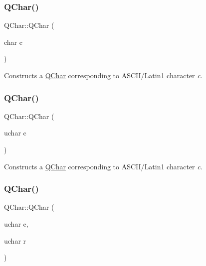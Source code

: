 \subsubsection{\texorpdfstring{QChar()}{QChar()}\hspace{0.1cm}{\footnotesize\ttfamily [2/9]}}
{\footnotesize\ttfamily Q\+Char\+::\+Q\+Char (\begin{DoxyParamCaption}\item[{char}]{c }\end{DoxyParamCaption})\hspace{0.3cm}{\ttfamily [inline]}}

Constructs a \mbox{\hyperlink{class_q_char}{Q\+Char}} corresponding to A\+S\+C\+I\+I/\+Latin1 character {\itshape c}. \mbox{\label{class_q_char_a4b67f8efac359d10c3c2b279624d1002}} 
\subsubsection{\texorpdfstring{QChar()}{QChar()}\hspace{0.1cm}{\footnotesize\ttfamily [3/9]}}
{\footnotesize\ttfamily Q\+Char\+::\+Q\+Char (\begin{DoxyParamCaption}\item[{uchar}]{c }\end{DoxyParamCaption})\hspace{0.3cm}{\ttfamily [inline]}}

Constructs a \mbox{\hyperlink{class_q_char}{Q\+Char}} corresponding to A\+S\+C\+I\+I/\+Latin1 character {\itshape c}. \mbox{\label{class_q_char_a7f5f54e09c49f6ea21627b924e9240c1}} 
\subsubsection{\texorpdfstring{QChar()}{QChar()}\hspace{0.1cm}{\footnotesize\ttfamily [4/9]}}
{\footnotesize\ttfamily Q\+Char\+::\+Q\+Char (\begin{DoxyParamCaption}\item[{uchar}]{c,  }\item[{uchar}]{r }\end{DoxyParamCaption})\hspace{0.3cm}{\ttfamily [inline]}}

